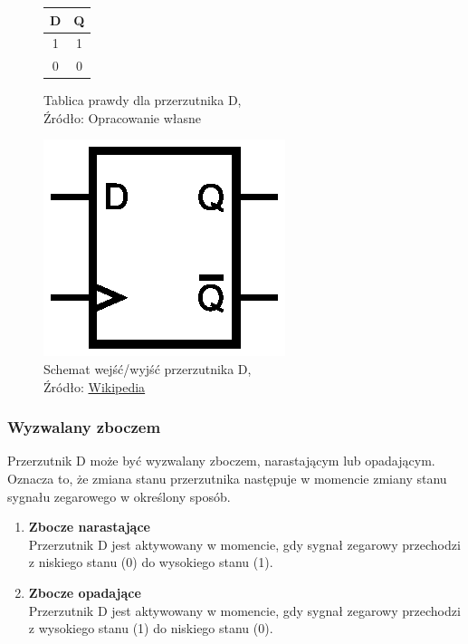 \documentclass{article}
\begin{document}
      \begin{figure}[!ht]
        \begin{minipage}{.5\textwidth}
            \centering
            \begin{tabular}{|c|c|}
            \hline
            \textbf{D} & \textbf{Q} \\
            \hline
            1 & 1 \\
            \hline
            0 & 0 \\
            \hline
            \end{tabular}
            \caption{Tablica prawdy dla przerzutnika D,
            \\Źródło: Opracowanie własne}
        \end{minipage}
        \begin{minipage}{.5\textwidth}
          \centering
          \includegraphics[scale=0.65]{grafiki/D_Flip-flop_(Simple)_Symbol.eps}
          \caption{Schemat wejść/wyjść przerzutnika D,
          \\Źródło: \href{https://pl.wikipedia.org/wiki/Plik:D_Flip-flop_(Simple)_Symbol.svg}{Wikipedia}}
        \end{minipage}
      \end{figure}

      \subsubsection{Wyzwalany zboczem}
        Przerzutnik D może być wyzwalany zboczem, narastającym lub opadającym. Oznacza to, że zmiana stanu przerzutnika następuje w momencie zmiany stanu sygnału zegarowego w określony sposób.

        \begin{enumerate}
          \item \textbf{Zbocze narastające} \\
          Przerzutnik D jest aktywowany w momencie, gdy sygnał zegarowy przechodzi z niskiego stanu (0) do wysokiego stanu (1).

          \item \textbf{Zbocze opadające} \\
          Przerzutnik D jest aktywowany w momencie, gdy sygnał zegarowy przechodzi z wysokiego stanu (1) do niskiego stanu (0).
        \end{enumerate}
\end{document}

